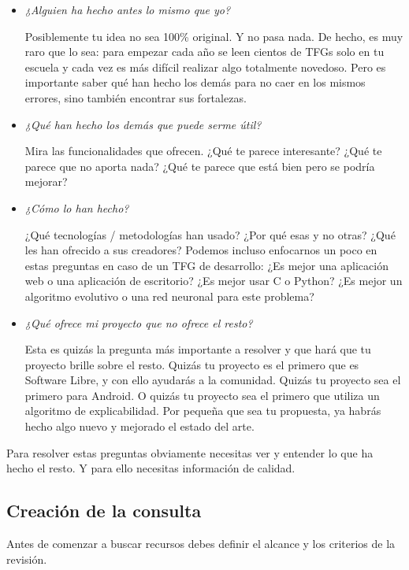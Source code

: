 \begin{itemize}
    \item \textit{¿Alguien ha hecho antes lo mismo que yo?}
    
Posiblemente tu idea no sea 100\% original. Y no pasa nada. De hecho, es muy raro que lo sea: para empezar cada año se leen cientos de TFGs solo en tu escuela y cada vez es más difícil realizar algo totalmente novedoso. Pero es importante saber qué han hecho los demás para no caer en los mismos errores, sino también encontrar sus fortalezas.

\item \textit{¿Qué han hecho los demás que puede serme útil?}

Mira las funcionalidades que ofrecen. ¿Qué te parece interesante? ¿Qué te parece que no aporta nada? ¿Qué te parece que está bien pero se podría mejorar?

\item \textit{¿Cómo lo han hecho?} 

¿Qué tecnologías / metodologías han usado? ¿Por qué esas y no otras? ¿Qué les han ofrecido a sus creadores? Podemos incluso enfocarnos un poco en estas preguntas en caso de un TFG de desarrollo: ¿Es mejor una aplicación web o una aplicación de escritorio? ¿Es mejor usar C o Python? ¿Es mejor un algoritmo evolutivo o una red neuronal para este problema?

\item \textit{¿Qué ofrece mi proyecto que no ofrece el resto?} 

Esta es quizás la pregunta más importante a resolver y que hará que tu proyecto brille sobre el resto. Quizás tu proyecto es el primero que es Software Libre, y con ello ayudarás a la comunidad. Quizás tu proyecto sea el primero para Android. O quizás tu proyecto sea el primero que utiliza un algoritmo de explicabilidad. Por pequeña que sea tu propuesta, ya habrás hecho algo nuevo y mejorado el estado del arte.

\end{itemize}

Para resolver estas preguntas obviamente necesitas ver y entender lo que ha hecho el resto. Y para ello necesitas información de calidad.

\subsection{Creación de la consulta}

Antes de comenzar a buscar recursos debes definir el alcance y los criterios de la revisión. 

